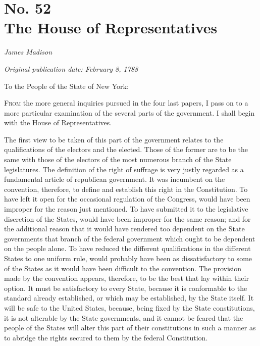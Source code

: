 \chapter[No. 52: The House of Representatives]{No. 52\\ {\small The House of Representatives}}

\textit{James Madison}

\textit{Original publication date: February 8, 1788}
\vspace{1cm}

To the People of the State of New York:
\vspace{.4cm}

\textsc{From} the more general inquiries pursued in the four last papers, I pass on to a more particular examination of the several parts of the government. 
I shall begin with the House of Representatives.

The first view to be taken of this part of the government relates to the qualifications of the electors and the elected. 
Those of the former are to be the same with those of the electors of the most numerous branch of the State legislatures. 
The definition of the right of suffrage is very justly regarded as a fundamental article of republican government. 
It was incumbent on the convention, therefore, to define and establish this right in the Constitution. 
To have left it open for the occasional regulation of the Congress, would have been improper for the reason just mentioned. 
To have submitted it to the legislative discretion of the States, would have been improper for the same reason; and for the additional reason that it would have rendered too dependent on the State governments that branch of the federal government which ought to be dependent on the people alone. 
To have reduced the different qualifications in the different States to one uniform rule, would probably have been as dissatisfactory to some of the States as it would have been difficult to the convention. 
The provision made by the convention appears, therefore, to be the best that lay within their option. 
It must be satisfactory to every State, because it is conformable to the standard already established, or which may be established, by the State itself. 
It will be safe to the United States, because, being fixed by the State constitutions, it is not alterable by the State governments, and it cannot be feared that the people of the States will alter this part of their constitutions in such a manner as to abridge the rights secured to them by the federal Constitution.

